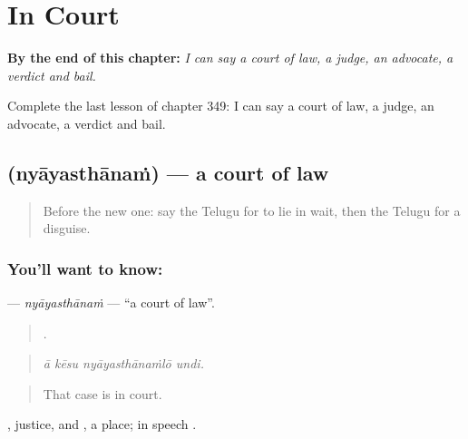 
\chapter{In Court}
\label{ch:te-in-court}

\begin{chapteropening}
\textbf{By the end of this chapter:} \emph{I can say a court of law, a judge, an advocate, a verdict and bail.}

Complete the last lesson of chapter 349: I can say a court of law, a judge, an advocate, a verdict and bail.
\end{chapteropening}

\section[\texorpdfstring{\te{న్యాయస్థానం} (nyāyasthānaṁ)}{న్యాయస్థానం (nyāyasthānaṁ)}]{ (nyāyasthānaṁ) — a court of law}

\label{lesson:TE-C349-nyayasthanam}



\begin{quote}
Before the new one: say the Telugu for to lie in wait, then the Telugu for a disguise.
\end{quote}

\subsection*{You'll want to know: }
\textbf{} — \emph{nyāyasthānaṁ} — \textquotedblleft{}a court of law\textquotedblright{}.

\begin{quote}
   .
\end{quote}

\begin{quote}
\emph{ā kēsu nyāyasthānaṁlō undi.}
\end{quote}

\begin{quote}
That case is in court.
\end{quote}

, justice, and , a place; in speech .

